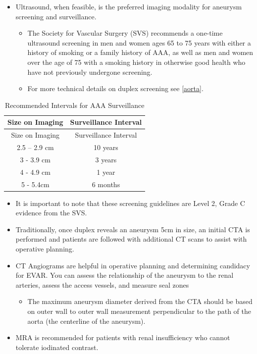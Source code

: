 \documentclass[
]{book}
\providecommand{\tightlist}{%
  \setlength{\itemsep}{0pt}\setlength{\parskip}{0pt}}
\begin{document}
\begin{itemize}
\item
  Ultrasound, when feasible, is the preferred imaging modality for
  aneurysm screening and surveillance.

  \begin{itemize}
  \tightlist
  \item
    The Society for Vascular Surgery (SVS) recommends a one-time
    ultrasound screening in men and women ages 65 to 75 years with
    either a history of smoking or a family history of AAA, as well
    as men and women over the age of 75 with a smoking history in
    otherwise good health who have not previously undergone
    screening. \citep{chaikofSocietyVascularSurgery2018a}
  \item
    For more technical details on duplex screening see \ref{aorta}.
  \end{itemize}
\end{itemize}

\begin{longtable}[]{@{}cc@{}}
\caption{Recommended Intervals for AAA Surveillance\citep{thompson2013, chaikofSocietyVascularSurgery2018a}}\tabularnewline
\toprule()
Size on Imaging & Surveillance Interval \\
\midrule()
\endfirsthead
\toprule()
Size on Imaging & Surveillance Interval \\
\midrule()
\endhead
2.5 -- 2.9 cm & 10 years \\
3 - 3.9 cm & 3 years \\
4 - 4.9 cm & 1 year \\
5 - 5.4cm & 6 months \\
\bottomrule()
\end{longtable}

\begin{itemize}
\item
  It is important to note that these screening guidelines are Level 2,
  Grade C evidence from the SVS.
\item
  Traditionally, once duplex reveals an aneurysm 5cm in size, an
  initial CTA is performed and patients are followed with additional
  CT scans to assist with operative planning.
\item
  CT Angiograms are helpful in operative planning and determining
  candidacy for EVAR. You can assess the relationship of the aneurysm
  to the renal arteries, assess the access vessels, and measure seal
  zones

  \begin{itemize}
  \tightlist
  \item
    The maximum aneurysm diameter derived from the CTA should be
    based on outer wall to outer wall measurement perpendicular to
    the path of the aorta (the centerline of the aneurysm).
  \end{itemize}
\item
  MRA is recommended for patients with renal insufficiency who cannot
  tolerate iodinated contrast.
\end{itemize}
\end{document}
